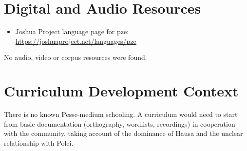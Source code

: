 \documentclass[12pt]{article}
\begin{document}
\section{Digital and Audio Resources}
\begin{itemize}
\item Joshua Project language page for pze: \url{https://joshuaproject.net/languages/pze}
\end{itemize}
No audio, video or corpus resources were found.

\section{Curriculum Development Context}
There is no known Pesse-medium schooling. A curriculum would need to start from basic documentation (orthography, wordlists, recordings) in cooperation with the community, taking account of the dominance of Hausa and the unclear relationship with Polci.
\end{document}
